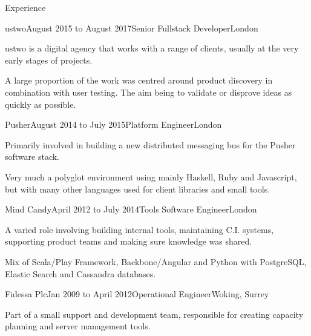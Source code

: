 \documentclass{resume} %
\begin{document}
\begin{rSection}{Experience}

  \begin{rExperience}{ustwo}{August 2015 to August 2017}{Senior Fullstack Developer}{London}
  \item ustwo is a digital agency that works with a range of clients, usually at the very early stages of projects.
  \item A large proportion of the work was centred around product discovery in combination with user testing. The aim being to validate or disprove ideas as quickly as possible.
  \end{rExperience}


  \begin{rExperience}{Pusher}{August 2014 to July 2015}{Platform Engineer}{London}
  \item Primarily involved in building a new distributed messaging bus for the Pusher software stack.
  \item Very much a polyglot environment using mainly Haskell, Ruby and Javascript, but with many other languages used for client libraries and small tools.
  \end{rExperience}


  \begin{rExperience}{Mind Candy}{April 2012 to July 2014}{Tools Software Engineer}{London}
  \item A varied role involving building internal tools, maintaining C.I. systems, supporting product teams and making sure knowledge was shared.
  \item Mix of Scala/Play Framework, Backbone/Angular and Python with PostgreSQL, Elastic Search and Cassandra databases.
  \end{rExperience}


  \begin{rExperience}{Fidessa Plc}{Jan 2009 to April 2012}{Operational Engineer}{Woking, Surrey}
  \item Part of a small support and development team, responsible for creating capacity planning and server management tools.
  \end{rExperience}

\end{rSection}
\end{document}
